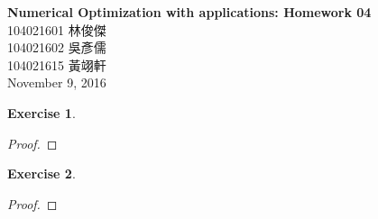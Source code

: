 \documentclass[11pt,a4paper]{article}
\renewcommand{\(}{\left(}
\renewcommand{\)}{\right)}
\renewcommand{\title}{Numerical Optimization with applications: Homework 04}
\renewcommand{\author}{104021601 林俊傑\\104021602 吳彥儒\\104021615 黃翊軒}
\renewcommand{\maketitle}{\begin{center}\textbf{\Large\title}\\[6pt] {\author}\\[6pt] {\color{Gray}\footnotesize November 9, 2016}\end{center}}
\newtheorem{exercise}{Exercise}
\begin{document}
  \maketitle
  
  \begin{exercise}
  	
  \end{exercise}  
  \begin{proof}
  	
  \end{proof}
  
  
  \begin{exercise}
  	
  \end{exercise}  
  \begin{proof}

  \end{proof}
  
  \setcounter{exercise}{3}
  
\end{document}
